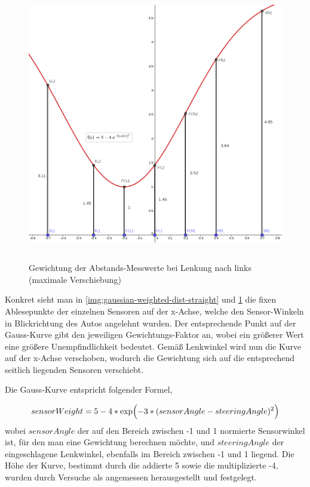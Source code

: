 \documentclass[12pt, a4paper]{scrartcl}
\begin{document}
\begin{figure}[ht]
	\centering
	\includegraphics[width=\textwidth, height=12cm, keepaspectratio]{Bilder/Gauss_Sensorgewichtung_geneigt.png}
	\caption{Gewichtung der Abstands-Messwerte bei Lenkung nach links (maximale Verschiebung)}
	\label{img:gaussian-weighted-dist-curve}
\end{figure}

Konkret sieht man in \autoref{img:gaussian-weighted-dist-straight} und \ref{img:gaussian-weighted-dist-curve} die fixen Ablesepunkte der einzelnen Sensoren auf der x-Achse, welche den Sensor-Winkeln in Blickrichtung des Autos angelehnt wurden. Der entsprechende Punkt auf der Gauss-Kurve gibt den jeweiligen Gewichtungs-Faktor an, wobei ein größerer Wert eine größere Unempfindlichkeit bedeutet. Gemäß Lenkwinkel wird nun die Kurve auf der x-Achse verschoben, wodurch die Gewichtung sich auf die entsprechend seitlich liegenden Sensoren verschiebt.

Die Gauss-Kurve entspricht folgender Formel,

\begin{equation}\label{eq:gaussian-weighted-dist}
sensorWeight= 5 - 4 * \exp\Bigl({-3 * (sensorAngle - steeringAngle)^2}\Bigr)
\end{equation}
wobei $sensorAngle$ der auf den Bereich zwischen -1 und 1 normierte Sensorwinkel ist, für den man eine Gewichtung berechnen möchte, und $steeringAngle$ der eingeschlagene Lenkwinkel, ebenfalls im Bereich zwischen -1 und 1 liegend. Die Höhe der Kurve, bestimmt durch die addierte 5 sowie die multiplizierte -4, wurden durch Versuche als angemessen herausgestellt und festgelegt.
\end{document}
